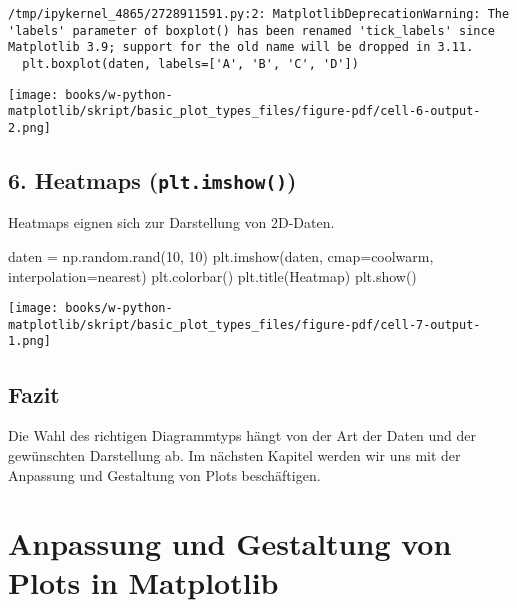 \documentclass[
  letterpaper,
  DIV=11,
  numbers=noendperiod]{scrreprt}
\newenvironment{Shaded}{\begin{snugshade}}{\end{snugshade}}
\newcommand{\DecValTok}[1]{\textcolor[rgb]{0.68,0.00,0.00}{#1}}
\newcommand{\NormalTok}[1]{\textcolor[rgb]{0.00,0.23,0.31}{#1}}
\newcommand{\OperatorTok}[1]{\textcolor[rgb]{0.37,0.37,0.37}{#1}}
\newcommand{\StringTok}[1]{\textcolor[rgb]{0.13,0.47,0.30}{#1}}
\begin{document}
\begin{tcolorbox}
\begin{verbatim}
/tmp/ipykernel_4865/2728911591.py:2: MatplotlibDeprecationWarning: The 'labels' parameter of boxplot() has been renamed 'tick_labels' since Matplotlib 3.9; support for the old name will be dropped in 3.11.
  plt.boxplot(daten, labels=['A', 'B', 'C', 'D'])
\end{verbatim}

\texttt{[image: books/w-python-matplotlib/skript/basic\_plot\_types\_files/figure-pdf/cell-6-output-2.png]}

\section{\texorpdfstring{6. Heatmaps
(\texttt{plt.imshow()})}{6. Heatmaps (plt.imshow())}}\label{heatmaps-plt.imshow}

Heatmaps eignen sich zur Darstellung von 2D-Daten.

\begin{Shaded}
\begin{Highlighting}[]
\NormalTok{daten }\OperatorTok{=}\NormalTok{ np.random.rand(}\DecValTok{10}\NormalTok{, }\DecValTok{10}\NormalTok{)}
\NormalTok{plt.imshow(daten, cmap}\OperatorTok{=}\StringTok{\textquotesingle{}coolwarm\textquotesingle{}}\NormalTok{, interpolation}\OperatorTok{=}\StringTok{\textquotesingle{}nearest\textquotesingle{}}\NormalTok{)}
\NormalTok{plt.colorbar()}
\NormalTok{plt.title(}\StringTok{\textquotesingle{}Heatmap\textquotesingle{}}\NormalTok{)}
\NormalTok{plt.show()}
\end{Highlighting}
\end{Shaded}

\texttt{[image: books/w-python-matplotlib/skript/basic\_plot\_types\_files/figure-pdf/cell-7-output-1.png]}

\section{Fazit}\label{fazit}

Die Wahl des richtigen Diagrammtyps hängt von der Art der Daten und der
gewünschten Darstellung ab. Im nächsten Kapitel werden wir uns mit der
Anpassung und Gestaltung von Plots beschäftigen.

\chapter{Anpassung und Gestaltung von Plots in
Matplotlib}\label{anpassung-und-gestaltung-von-plots-in-matplotlib}


\end{tcolorbox}
\end{document}
